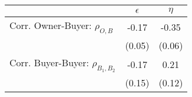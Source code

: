 \begin{tabular}{lcc}
& $\epsilon$ & $\eta$ \\
\hline
Corr. Owner-Buyer: $\rho_{O,B}$ &-0.17&-0.35\\
  & (0.05) & (0.06) \\
Corr. Buyer-Buyer: $\rho_{B_1,B_2}$ &-0.17&0.21\\
 & (0.15) & (0.12) \\
\end{tabular}
